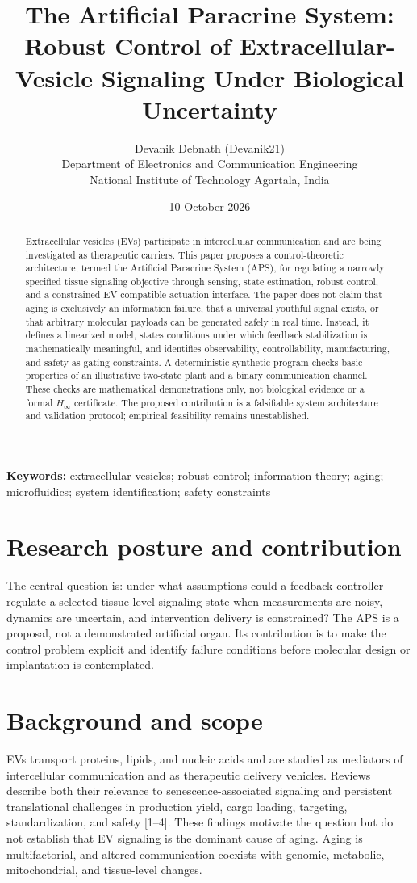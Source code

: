 \documentclass[11pt]{article}
\title{The Artificial Paracrine System: Robust Control of Extracellular-Vesicle Signaling Under Biological Uncertainty}
\author{Devanik Debnath (Devanik21)\\\small Department of Electronics and Communication Engineering\\\small National Institute of Technology Agartala, India}
\date{10 October 2026}
\begin{document}
\maketitle
\begin{abstract}
Extracellular vesicles (EVs) participate in intercellular communication and are being investigated as therapeutic carriers. This paper proposes a control-theoretic architecture, termed the Artificial Paracrine System (APS), for regulating a narrowly specified tissue signaling objective through sensing, state estimation, robust control, and a constrained EV-compatible actuation interface. The paper does not claim that aging is exclusively an information failure, that a universal youthful signal exists, or that arbitrary molecular payloads can be generated safely in real time. Instead, it defines a linearized model, states conditions under which feedback stabilization is mathematically meaningful, and identifies observability, controllability, manufacturing, and safety as gating constraints. A deterministic synthetic program checks basic properties of an illustrative two-state plant and a binary communication channel. These checks are mathematical demonstrations only, not biological evidence or a formal $H_\infty$ certificate. The proposed contribution is a falsifiable system architecture and validation protocol; empirical feasibility remains unestablished.
\end{abstract}
\noindent\textbf{Keywords:} extracellular vesicles; robust control; information theory; aging; microfluidics; system identification; safety constraints

\section{Research posture and contribution}
The central question is: under what assumptions could a feedback controller regulate a selected tissue-level signaling state when measurements are noisy, dynamics are uncertain, and intervention delivery is constrained? The APS is a proposal, not a demonstrated artificial organ. Its contribution is to make the control problem explicit and identify failure conditions before molecular design or implantation is contemplated.

\section{Background and scope}
EVs transport proteins, lipids, and nucleic acids and are studied as mediators of intercellular communication and as therapeutic delivery vehicles. Reviews describe both their relevance to senescence-associated signaling and persistent translational challenges in production yield, cargo loading, targeting, standardization, and safety [1--4]. These findings motivate the question but do not establish that EV signaling is the dominant cause of aging. Aging is multifactorial, and altered communication coexists with genomic, metabolic, mitochondrial, and tissue-level changes.
\end{document}
